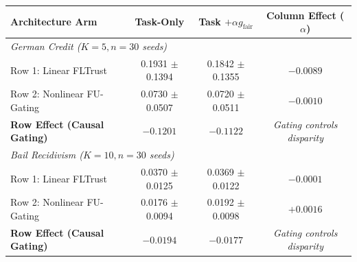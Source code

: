 \begin{table}[!t]
{\begin{tabular}{lccc}
\midrule
\textbf{Architecture Arm} & \textbf{Task-Only} & \textbf{Task $+ \alpha g_{\text{fair}}$} & \textbf{Column Effect ($\alpha$)} \\
\midrule
\multicolumn{4}{l}{\textit{German Credit ($K=5, n=30$ seeds)}} \\
Row 1: Linear FLTrust & 0.1931 $\pm$ 0.1394 & 0.1842 $\pm$ 0.1355 & $-0.0089$ \\
Row 2: Nonlinear FU-Gating & 0.0730 $\pm$ 0.0507 & 0.0720 $\pm$ 0.0511 & $-0.0010$ \\
\addlinespace[1pt]
\textbf{Row Effect (Causal Gating)} & $\mathbf{-0.1201}$ & $\mathbf{-0.1122}$ & \textit{Gating controls disparity} \\
\midrule
\multicolumn{4}{l}{\textit{Bail Recidivism ($K=10, n=30$ seeds)}} \\
Row 1: Linear FLTrust & 0.0370 $\pm$ 0.0125 & 0.0369 $\pm$ 0.0122 & $-0.0001$ \\
Row 2: Nonlinear FU-Gating & 0.0176 $\pm$ 0.0094 & 0.0192 $\pm$ 0.0098 & $+0.0016$ \\
\addlinespace[1pt]
\textbf{Row Effect (Causal Gating)} & $\mathbf{-0.0194}$ & $\mathbf{-0.0177}$ & \textit{Gating controls disparity} \\
\bottomrule
\end{tabular}%
}
\end{table}
